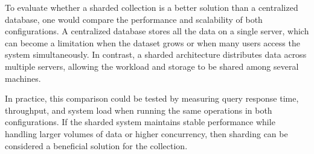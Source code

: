 \documentclass[11pt]{article}
\begin{document}
\begin{tcolorbox}

To evaluate whether a sharded collection is a better solution than a centralized database, one would compare the performance and scalability of both configurations. A centralized database stores all the data on a single server, which can become a limitation when the dataset grows or when many users access the system simultaneously. In contrast, a sharded architecture distributes data across multiple servers, allowing the workload and storage to be shared among several machines.

In practice, this comparison could be tested by measuring query response time, throughput, and system load when running the same operations in both configurations. If the sharded system maintains stable performance while handling larger volumes of data or higher concurrency, then sharding can be considered a beneficial solution for the collection.

\end{tcolorbox}
\end{document}
